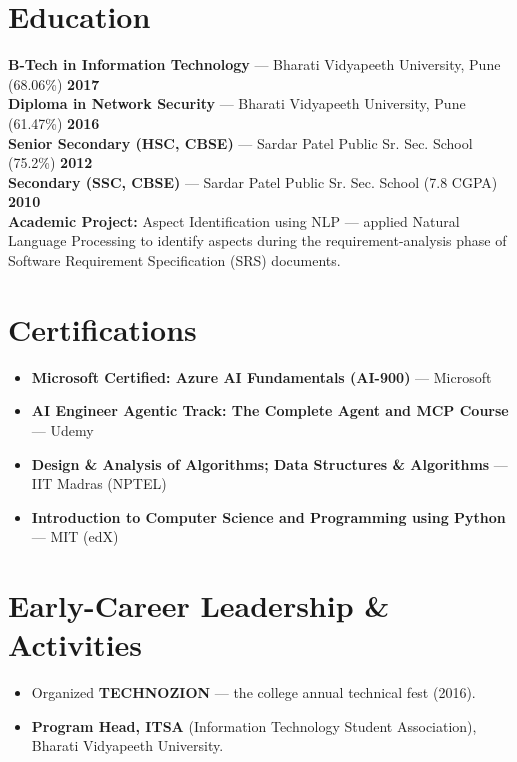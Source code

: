 \documentclass[10pt,a4paper]{article}
\begin{document}
\section{Education}
\small
\noindent \textbf{B-Tech in Information Technology} --- Bharati Vidyapeeth University, Pune (68.06\%) \hfill \textbf{2017} \\
\noindent \textbf{Diploma in Network Security} --- Bharati Vidyapeeth University, Pune (61.47\%) \hfill \textbf{2016} \\
\noindent \textbf{Senior Secondary (HSC, CBSE)} --- Sardar Patel Public Sr. Sec. School (75.2\%) \hfill \textbf{2012} \\
\noindent \textbf{Secondary (SSC, CBSE)} --- Sardar Patel Public Sr. Sec. School (7.8 CGPA) \hfill \textbf{2010} \\[3pt]
\noindent \textbf{\color{primary2}Academic Project:} Aspect Identification using NLP --- applied Natural Language Processing to identify aspects during the requirement-analysis phase of Software Requirement Specification (SRS) documents.
\normalsize

\section{Certifications}
\small
\begin{itemize}
    \item \textbf{Microsoft Certified: Azure AI Fundamentals (AI-900)} --- Microsoft
    \item \textbf{AI Engineer Agentic Track: The Complete Agent and MCP Course} --- Udemy
    \item \textbf{Design \& Analysis of Algorithms; Data Structures \& Algorithms} --- IIT Madras (NPTEL)
    \item \textbf{Introduction to Computer Science and Programming using Python} --- MIT (edX)
\end{itemize}
\normalsize

\section{Early-Career Leadership \& Activities}
\small
\begin{itemize}
    \item Organized \textbf{TECHNOZION} --- the college annual technical fest (2016).
    \item \textbf{Program Head, ITSA} (Information Technology Student Association), Bharati Vidyapeeth University.
\end{itemize}
\normalsize
\end{document}

